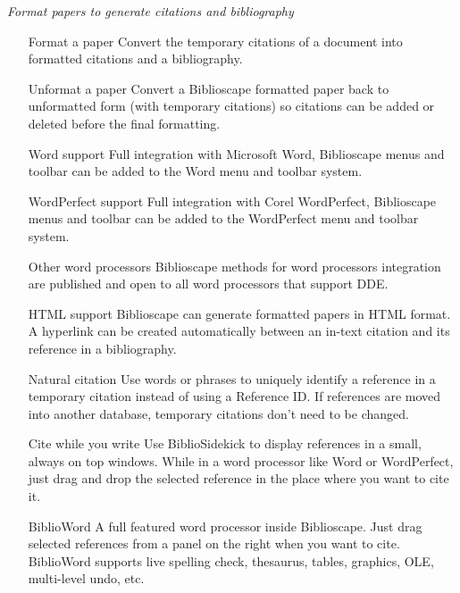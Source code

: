 \textit{Format papers to generate citations and bibliography}

\begin{itemize}
\item  [Format a paper] Convert the temporary citations of a document
 into formatted citations and a bibliography.

 \item[Unformat a paper] Convert a Biblioscape formatted paper back to
 unformatted form (with temporary citations) so citations can be
 added or deleted before the final formatting.

 \item[Word support] Full integration with Microsoft Word, Biblioscape
 menus and toolbar can be added to the Word menu and toolbar
 system.

 \item[WordPerfect support] Full integration with Corel WordPerfect,
 Biblioscape menus and toolbar can be added to the WordPerfect
 menu and toolbar system.

 \item[Other word processors] Biblioscape methods for word processors
 integration are published and open to all word processors that
 support DDE.

 \item[HTML support] Biblioscape can generate formatted papers in HTML
 format. A hyperlink can be created automatically between an
 in-text citation and its reference in a bibliography.

 \item[Natural citation] Use words or phrases to uniquely identify a
 reference in a temporary citation instead of using a Reference ID.
 If references are moved into another database, temporary citations
 don't need to be changed.

 \item[Cite while you write] Use BiblioSidekick to display references in a
  small, always on top windows. While in a word processor like Word
 or WordPerfect, just drag and drop the selected reference in the
 place where you want to cite it.

 \item[BiblioWord] A full featured word processor inside Biblioscape. Just
 drag selected references from a panel on the right when you want
 to cite. BiblioWord supports live spelling check, thesaurus, tables,
 graphics, OLE, multi-level undo, etc.

\end{itemize}


